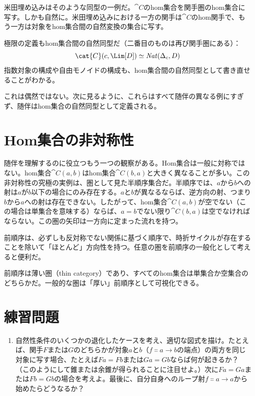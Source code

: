 米田埋め込みはそのような同型の一例だ。$\cat{C}$のhom集合を関手圏のhom集合に写す。しかも自然に。米田埋め込みにおける一方の関手は$\cat{C}$のhom関手で、もう一方は対象をhom集合間の自然変換の集合に写す。

極限の定義もhom集合間の自然同型だ（二番目のものは再び関手圏にある）：
\[\cat{C}(c, \Lim[D]) \simeq \mathit{Nat}(\Delta_c, D)\]
指数対象の構成や自由モノイドの構成も、hom集合間の自然同型として書き直せることがわかる。

これは偶然ではない。次に見るように、これらはすべて随伴の異なる例にすぎず、随伴はhom集合の自然同型として定義される。

\section{Hom集合の非対称性}

随伴を理解するのに役立つもう一つの観察がある。Hom集合は一般に対称ではない。hom集合$\cat{C}(a, b)$はhom集合$\cat{C}(b, a)$と大きく異なることが多い。この非対称性の究極の実例は、圏として見た半順序集合だ。半順序では、$a$から$b$への射は$a$が$b$以下の場合にのみ存在する。$a$と$b$が異なるならば、逆方向の射、つまり$b$から$a$への射は存在できない。したがって、hom集合$\cat{C}(a, b)$が空でない（この場合は単集合を意味する）ならば、$a = b$でない限り$\cat{C}(b, a)$は空でなければならない。この圏の矢印は一方向に定まった流れを持つ。

前順序は、必ずしも反対称でない関係に基づく順序で、時折サイクルが存在することを除いて「ほとんど」方向性を持つ。任意の圏を前順序の一般化として考えると便利だ。

前順序は薄い圏（thin category）であり、すべてのhom集合は単集合か空集合のどちらかだ。一般的な圏は「厚い」前順序として可視化できる。

\section{練習問題}

\begin{enumerate}
  \tightlist
  \item
        自然性条件のいくつかの退化したケースを考え、適切な図式を描け。たとえば、関手$F$または$G$のどちらかが対象$a$と$b$（$f \Colon a \to b$の端点）の両方を同じ対象に写す場合、たとえば$F a = F b$または$G a = G b$ならば何が起きるか？（このようにして錐または余錐が得られることに注目せよ。）次に$F a = G a$または$F b = G b$の場合を考えよ。最後に、自分自身へのループ射$f \Colon a \to a$から始めたらどうなるか？
\end{enumerate}
